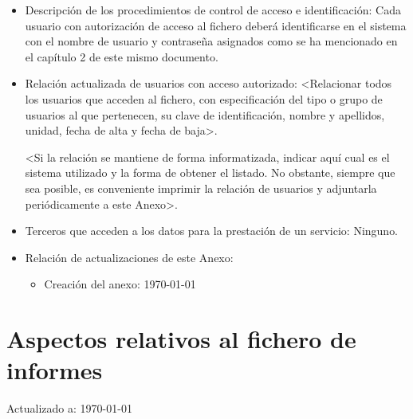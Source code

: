 \documentclass[a4paper,11pt,bibtotoc,noliststotoc]{scrbook}
\begin{document}
\begin{itemize}
\item Descripción de los procedimientos de control de acceso e identificación: Cada usuario con autorización de acceso al fichero deberá identificarse en el sistema con el nombre de usuario y contraseña asignados como se ha mencionado en el capítulo 2 de este mismo documento.

\item Relación actualizada de usuarios con acceso autorizado: <Relacionar todos los usuarios que acceden al fichero, con especificación del tipo o grupo de usuarios al que pertenecen, su clave de identificación, nombre y apellidos, unidad, fecha de alta y fecha de baja>.

<Si la relación se mantiene de forma informatizada, indicar aquí cual es el sistema utilizado y la forma de obtener el listado. No obstante, siempre que sea posible, es conveniente imprimir la relación de usuarios y adjuntarla periódicamente a este Anexo>.

\item Terceros que acceden a los datos para la prestación de un servicio: Ninguno.


\item Relación de actualizaciones de este Anexo: 

	\begin{itemize}
	\item Creación del anexo: \today
	\end{itemize}

\end{itemize}








\section{Aspectos relativos al fichero de informes}


Actualizado a: \today
\end{document}
